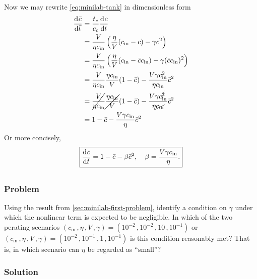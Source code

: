 \documentclass[12pt]{article}
\begin{document}
Now we may rewrite \cref{eq:minilab-tank} in dimensionless form
\begin{equation}
  \begin{aligned}
    \frac{\mathrm{d}^{} {\bar{c}}}{\mathrm{d}{\bar{t}}^{}} &=
    \frac{t_c}{c_c}\frac{\mathrm{d}^{} {c}}{\mathrm{d}{t}^{}} \\
    &= \frac{V}{\eta c_{\text{in}}} \left(\frac{\eta}{V}(c_{\text{in}}-c)-\gamma
    c^2\right) \\
    &= \frac{V}{\eta c_{\text{in}}}
    \left(\frac{\eta}{V}(c_{\text{in}}-\bar{c}c_{\text{in}})-\gamma
    (\bar{c}c_{\text{in}})^2\right) \\
    &= \frac{V}{\eta c_{\text{in}}}\frac{\eta c_{\text{in}}}{V} (1-\bar{c}) -
    \frac{V\gamma c_{\text{in}}^2}{\eta c_{\text{in}}}\bar{c}^2 \\
    &= \cancel{\frac{V}{\eta c_{\text{in}}}} \cancel{\frac{\eta c_{\text{in}}}{V}}
    (1-\bar{c}) -
    \frac{V \gamma c_{\text{in}}^{\cancel{2}}}{\eta \cancel{c_{\text{in}}}}\bar{c}^2 \\
    &= 1-\bar{c} - \frac{V \gamma c_{\text{in}}}{\eta}\bar{c}^2 \\
  \end{aligned}
\end{equation}
Or more concisely,
\begin{equation} \boxed{
    \frac{\mathrm{d}^{} {\bar{c}}}{\mathrm{d}{\bar{t}}^{}} = 1 - \bar{c} - \beta\bar{c}^2,
    \quad \beta = \frac{V \gamma c_{\text{in}}}{\eta}.
    }
\end{equation}

\subsection{}
\label{sec:minilab-second-problem}
\subsubsection*{Problem}
Using the result from \cref{sec:minilab-first-problem}, identify a condition on
$\gamma$ under which the nonlinear term is expected to be negligible. In which
of the two perating scenarios
$(c_{\text{in}}\,,\eta\,,V\,,\gamma) = (10^{-2}\,,10^{-2}\,,10\,,10^{-1})$ or
$(c_{\text{in}}\,,\eta\,,V\,,\gamma) = (10^{-2}\,,10^{-1}\,,1\,,10^{-1})$ is
this condition reasonably met? That is, in which scenario can $\eta$ be regarded
as ``small''?

\subsubsection*{Solution}
\todo
\end{document}
